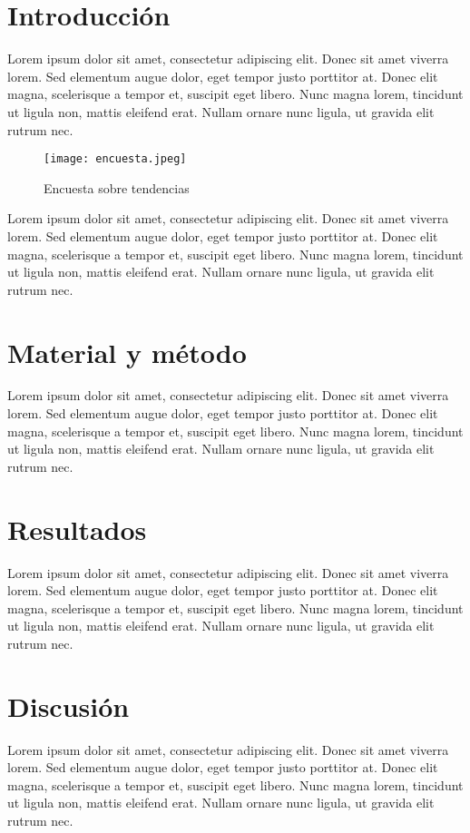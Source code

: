 \documentclass[a4paper, 10pt]{article}
\begin{document}
	\begin{multicols}{2}
		\section{Introducción}
		Lorem ipsum dolor sit amet, consectetur adipiscing elit. Donec sit amet viverra lorem. Sed elementum augue dolor, eget tempor justo porttitor at. Donec elit magna, scelerisque a tempor et, suscipit eget libero. Nunc magna lorem, tincidunt ut ligula non, mattis eleifend erat. Nullam ornare nunc ligula, ut gravida elit rutrum nec. 
                \begin{figure}[H] %
		 	\centering
		 	\texttt{[image: encuesta.jpeg]} %
		 	\caption{Encuesta sobre tendencias}
		 	\label{fig:encuesta}
	        \end{figure}
	 
	        Lorem ipsum dolor sit amet, consectetur adipiscing elit. Donec sit amet viverra lorem. Sed elementum augue dolor, eget tempor justo porttitor at. Donec elit magna, scelerisque a tempor et, suscipit eget libero. Nunc magna lorem, tincidunt ut ligula non, mattis eleifend erat. Nullam ornare nunc ligula, ut gravida elit rutrum nec. \cite{autor2024}
		
		\section{Material y método}
		Lorem ipsum dolor sit amet, consectetur adipiscing elit. Donec sit amet viverra lorem. Sed elementum augue dolor, eget tempor justo porttitor at. Donec elit magna, scelerisque a tempor et, suscipit eget libero. Nunc magna lorem, tincidunt ut ligula non, mattis eleifend erat. Nullam ornare nunc ligula, ut gravida elit rutrum nec.
		
		\section{Resultados}
		Lorem ipsum dolor sit amet, consectetur adipiscing elit. Donec sit amet viverra lorem. Sed elementum augue dolor, eget tempor justo porttitor at. Donec elit magna, scelerisque a tempor et, suscipit eget libero. Nunc magna lorem, tincidunt ut ligula non, mattis eleifend erat. Nullam ornare nunc ligula, ut gravida elit rutrum nec.
		
		\section{Discusión}
		Lorem ipsum dolor sit amet, consectetur adipiscing elit. Donec sit amet viverra lorem. Sed elementum augue dolor, eget tempor justo porttitor at. Donec elit magna, scelerisque a tempor et, suscipit eget libero. Nunc magna lorem, tincidunt ut ligula non, mattis eleifend erat. Nullam ornare nunc ligula, ut gravida elit rutrum nec.
		

\end{multicols}
\end{document}
